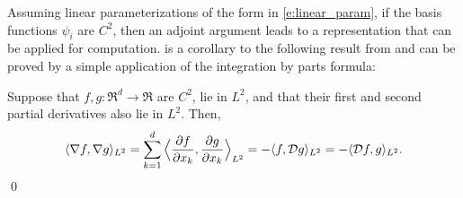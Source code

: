 Assuming linear parameterizations of the form in \eqref{e:linear_param}, if the basis functions $\psi_i$ are $C^2$, then an adjoint argument leads to a representation that can be applied for computation.   is a corollary to the following result from \cite{hwanorwu15,yanlaumehmey16} and can be proved by a simple application of the integration by parts formula:
\begin{proposition}
	\label{prop:lang_generator_grad}
	Suppose that $f,g\colon\Re^d \to\Re$ are $C^2$, lie in $L^2$, and that their first and second partial derivatives also lie in $L^2$. Then,
	\begin{equation}
	\langle \nabla f, \nabla g \rangle_{L^2} = \sum_{k=1}^d \Big \langle \frac{\partial f}{\partial x_k},  \frac{\partial g} {\partial x_k}\Big \rangle_{L^2}  = - \langle  f, \generate g\rangle_{L^2} = - \langle \generate f , g \rangle_{L^2}.
	\label{e:gradDual}
	\end{equation}
	\qed
\end{proposition} 
